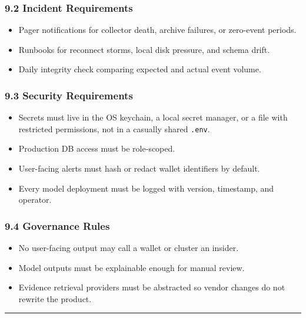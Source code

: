 \documentclass[
]{article}
\providecommand{\tightlist}{%
  \setlength{\itemsep}{0pt}\setlength{\parskip}{0pt}}
\begin{document}
\subsubsection{9.2 Incident
Requirements}\label{92-incident-requirements}

\begin{itemize}
\tightlist
\item
  Pager notifications for collector death, archive failures, or
  zero-event periods.
\item
  Runbooks for reconnect storms, local disk pressure, and schema drift.
\item
  Daily integrity check comparing expected and actual event volume.
\end{itemize}

\subsubsection{9.3 Security
Requirements}\label{93-security-requirements}

\begin{itemize}
\tightlist
\item
  Secrets must live in the OS keychain, a local secret manager, or a
  file with restricted permissions, not in a casually shared
  \texttt{.env}.
\item
  Production DB access must be role-scoped.
\item
  User-facing alerts must hash or redact wallet identifiers by default.
\item
  Every model deployment must be logged with version, timestamp, and
  operator.
\end{itemize}

\subsubsection{9.4 Governance Rules}\label{94-governance-rules}

\begin{itemize}
\tightlist
\item
  No user-facing output may call a wallet or cluster an insider.
\item
  Model outputs must be explainable enough for manual review.
\item
  Evidence retrieval providers must be abstracted so vendor changes do
  not rewrite the product.
\end{itemize}

\begin{center}\rule{0.5\linewidth}{0.5pt}\end{center}
\end{document}
